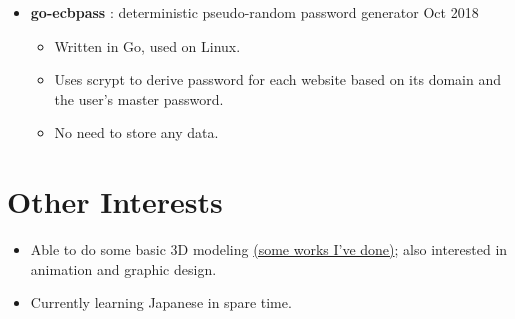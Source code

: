 \documentclass[a4paper]{article}
\begin{document}
\begin{itemize}
    \item \textbf{go-ecbpass} : deterministic pseudo-random password generator \dashdiv{} Oct 2018

    \begin{itemize}
      \item Written in Go, used on Linux.

      \item Uses scrypt to derive password for each website based on its domain and the user's master password.

      \item No need to store any data.
    \end{itemize}

  \end{itemize}

  \section{Other Interests}

  \begin{itemize}[itemsep=0.1\parskip]
    \item Able to do some basic 3D modeling \href{https://maowtm.org/Artworks/}{\color{link}(some works I've done)}; also interested in animation and graphic design.
    \item Currently learning Japanese in spare time.
  \end{itemize}
\end{document}
